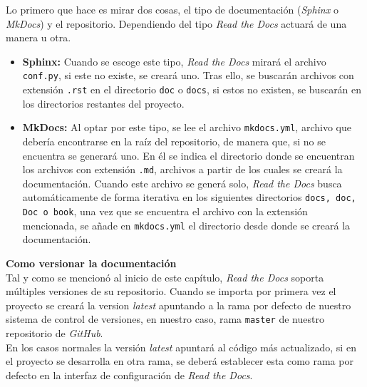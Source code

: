 \documentclass[a4paper, 12pt]{book}
\begin{document}
Lo primero que hace es mirar dos cosas, el tipo de documentación (\emph{Sphinx} o \emph{MkDocs}) y el repositorio. Dependiendo del tipo \emph{Read the Docs} actuará de una manera u otra.
\begin{itemize}
    \item \textbf{Sphinx: } Cuando se escoge este tipo, \emph{Read the Docs} mirará el archivo \texttt{conf.py}, si este no existe, se creará uno. Tras ello, se buscarán archivos con extensión \texttt{.rst} en el directorio \texttt{doc} o \texttt{docs}, si estos no existen, se buscarán en los directorios restantes del proyecto.
    \item \textbf{MkDocs: } Al optar por este tipo, se lee el archivo \texttt{mkdocs.yml}, archivo que debería encontrarse en la raíz del repositorio, de manera que, si no se encuentra se generará uno. En él se indica el directorio donde se encuentran los archivos con extensión \texttt{.md}, archivos a partir de los cuales se creará la documentación.
    Cuando este archivo se generá solo, \emph{Read the Docs} busca automáticamente de forma iterativa en los siguientes directorios \texttt{docs, doc, Doc o book}, una vez que se encuentra el archivo con la extensión mencionada, se añade en \texttt{mkdocs.yml} el directorio desde donde se creará la documentación. 
\end{itemize}
\textbf{Como versionar la documentación} \\
Tal y como se mencionó al inicio de este capítulo, \emph{Read the Docs} soporta múltiples versiones de su repositorio. Cuando se importa por primera vez el proyecto se creará la version \emph{latest} apuntando a la rama por defecto de nuestro sistema de control de versiones, en nuestro caso, rama \texttt{master} de nuestro repositorio de \emph{GitHub}. \\
En los casos normales la versión \emph{latest} apuntará al código más actualizado, si en el proyecto se desarrolla en otra rama, se deberá establecer esta como rama por defecto en la interfaz de configuración de \emph{Read the Docs}. \\
\end{document}
